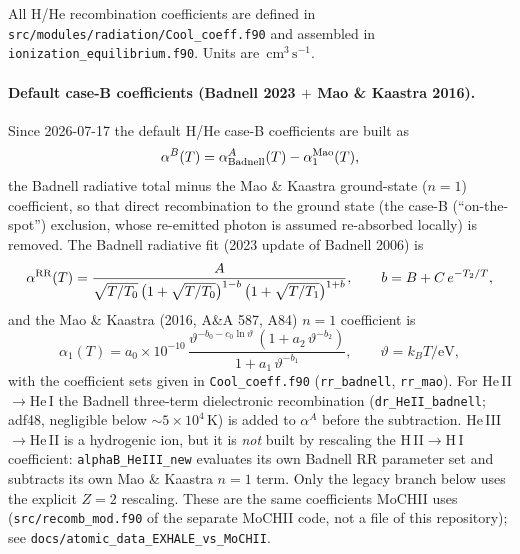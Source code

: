 \documentclass[english,a4paper]{my_memo}
\newcommand{\acm}{\ensuremath{\,\mathrm{cm^3\,s^{-1}}}}
\begin{document}
All H/He recombination coefficients are defined in
\texttt{src/modules/radiation/Cool\_coeff.f90} and assembled in
\texttt{ionization\_equilibrium.f90}. Units are \acm{}.

\paragraph{Default case-B coefficients (Badnell 2023 $+$ Mao \& Kaastra 2016).}
Since 2026-07-17 the default H/He case-B coefficients are built as
\begin{equation}
\alpha^{B}(T) = \alpha^{A}_{\rm Badnell}(T) - \alpha_{1}^{\rm Mao}(T),
\end{equation}
the Badnell radiative total minus the Mao \& Kaastra ground-state ($n=1$)
coefficient, so that direct recombination to the ground state (the case-B
(``on-the-spot'') exclusion, whose re-emitted photon is assumed re-absorbed
locally) is removed. The Badnell radiative fit (2023 update of Badnell 2006)
is
\begin{equation}
\alpha^{\rm RR}(T) = \frac{A}{\sqrt{T/T_0}\,
   \bigl(1+\sqrt{T/T_0}\bigr)^{1-b}\,
   \bigl(1+\sqrt{T/T_1}\bigr)^{1+b}},
\qquad b = B + C\,e^{-T_2/T},
\end{equation}
and the Mao \& Kaastra (2016, A\&A 587, A84) $n=1$ coefficient is
\begin{equation}
\alpha_1(T) = a_0\times10^{-10}\,
   \frac{\vartheta^{-b_0-c_0\ln\vartheta}\,(1+a_2\,\vartheta^{-b_2})}
        {1+a_1\,\vartheta^{-b_1}},
\qquad \vartheta = k_B T/\mathrm{eV},
\end{equation}
with the coefficient sets given in \texttt{Cool\_coeff.f90}
(\texttt{rr\_badnell}, \texttt{rr\_mao}). For He\,II$\to$He\,I the Badnell
three-term dielectronic recombination (\texttt{dr\_HeII\_badnell}; adf48,
negligible below $\sim$$5\times10^4\,$K) is added to $\alpha^{A}$ before the
subtraction. He\,III$\to$He\,II is a hydrogenic ion, but it is \emph{not} built by
rescaling the H\,II$\to$H\,I coefficient: \texttt{alphaB\_HeIII\_new} evaluates its
own Badnell RR parameter set and subtracts its own Mao \& Kaastra $n=1$ term.
Only the legacy branch below uses the explicit $Z=2$ rescaling. These are the
same coefficients MoCHII uses (\texttt{src/recomb\_mod.f90} of the separate
MoCHII code, not a file of this repository); see \texttt{docs/atomic\_data\_EXHALE\_vs\_MoCHII}.
\end{document}
